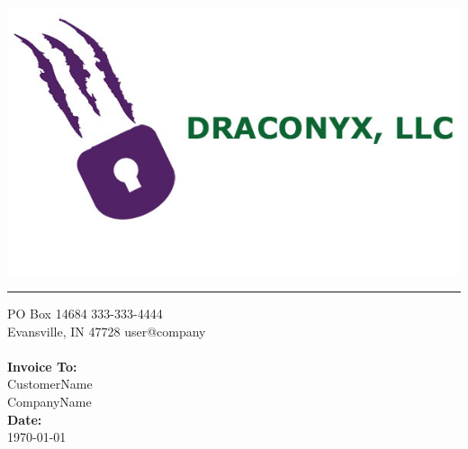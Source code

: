 \documentclass{invoice} %
\def \tab {\hspace*{3ex}} %
\begin{document}

\hfil{\includegraphics[scale=0.2]{draconyx-splash.jpg}}\hfil
\hrule %

PO Box 14684 \hfill 333-333-4444 \\ %
Evansville, IN 47728  \hfill user@company
\\ \\
{\bf Invoice To:} \\
\tab CustomerName\\ %
\tab CompanyName \\ %
{\bf Date:} \\
\tab \today \\ %


\begin{invoiceTable}



\end{invoiceTable}

\end{document}
